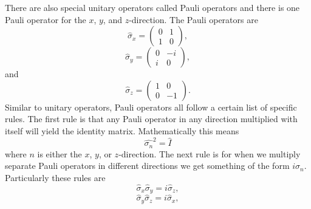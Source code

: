 \documentclass[twocolumn]{article}
\begin{document}
There are also special unitary operators called Pauli operators and there is one Pauli operator for the $x$, $y$, and $z$-direction. The Pauli operators are
\begin{equation}\label{eq:16}
\hat{\sigma}_x=
\begin{pmatrix}
0 & 1 \\
1 & 0
\end{pmatrix},
\end{equation}
\begin{equation}\label{eq:17}
\hat{\sigma}_y=
\begin{pmatrix}
0 & -i \\
i & 0
\end{pmatrix},
\end{equation}
and
\begin{equation}\label{eq:18}
\hat{\sigma}_z=
\begin{pmatrix}
1 & 0 \\
0 & -1
\end{pmatrix}.
\end{equation}
Similar to unitary operators, Pauli operators all follow a certain list of specific rules. The first rule is that any Pauli operator in any direction multiplied with itself will yield the identity matrix. Mathematically this means
\begin{equation}\label{eq:19}
\hat{\sigma_n}^2=\hat{I}
\end{equation}
where $n$ is either the $x$, $y$, or $z$-direction. The next rule is for when we multiply separate Pauli operators in different directions we get something of the form $i\sigma_n$. Particularly these rules are
\begin{equation}\label{eq:20}
\hat{\sigma}_x\hat{\sigma}_y=i\hat{\sigma}_z,
\end{equation}
\begin{equation}\label{eq:21}
\hat{\sigma}_y\hat{\sigma}_z=i\hat{\sigma}_x,
\end{equation}
\end{document}
